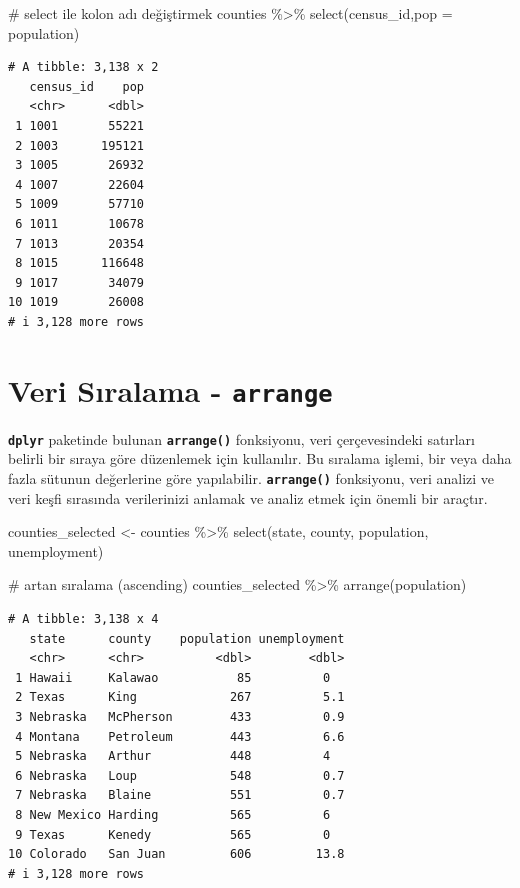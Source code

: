 \documentclass[
  letterpaper,
  DIV=11,
  numbers=noendperiod]{scrreprt}
\newenvironment{Shaded}{\begin{snugshade}}{\end{snugshade}}
\newcommand{\AttributeTok}[1]{\textcolor[rgb]{0.40,0.45,0.13}{#1}}
\newcommand{\CommentTok}[1]{\textcolor[rgb]{0.37,0.37,0.37}{#1}}
\newcommand{\FunctionTok}[1]{\textcolor[rgb]{0.28,0.35,0.67}{#1}}
\newcommand{\NormalTok}[1]{\textcolor[rgb]{0.00,0.23,0.31}{#1}}
\newcommand{\OtherTok}[1]{\textcolor[rgb]{0.00,0.23,0.31}{#1}}
\newcommand{\SpecialCharTok}[1]{\textcolor[rgb]{0.37,0.37,0.37}{#1}}
\begin{document}
\begin{Shaded}
\begin{Highlighting}[]
\CommentTok{\# select ile kolon adı değiştirmek}
\NormalTok{counties }\SpecialCharTok{\%\textgreater{}\%}
\FunctionTok{select}\NormalTok{(census\_id,}\AttributeTok{pop =}\NormalTok{ population)}
\end{Highlighting}
\end{Shaded}

\begin{verbatim}
# A tibble: 3,138 x 2
   census_id    pop
   <chr>      <dbl>
 1 1001       55221
 2 1003      195121
 3 1005       26932
 4 1007       22604
 5 1009       57710
 6 1011       10678
 7 1013       20354
 8 1015      116648
 9 1017       34079
10 1019       26008
# i 3,128 more rows
\end{verbatim}

\section*{\texorpdfstring{Veri Sıralama -
\texttt{arrange}}{Veri Sıralama - arrange}}\label{veri-sux131ralama---arrange}


\textbf{\texttt{dplyr}} paketinde bulunan \textbf{\texttt{arrange()}}
fonksiyonu, veri çerçevesindeki satırları belirli bir sıraya göre
düzenlemek için kullanılır. Bu sıralama işlemi, bir veya daha fazla
sütunun değerlerine göre yapılabilir. \textbf{\texttt{arrange()}}
fonksiyonu, veri analizi ve veri keşfi sırasında verilerinizi anlamak ve
analiz etmek için önemli bir araçtır.

\begin{Shaded}
\begin{Highlighting}[]
\NormalTok{counties\_selected }\OtherTok{\textless{}{-}}\NormalTok{ counties }\SpecialCharTok{\%\textgreater{}\%}
\FunctionTok{select}\NormalTok{(state, county, population, unemployment)}

\CommentTok{\# artan sıralama (ascending)}
\NormalTok{counties\_selected }\SpecialCharTok{\%\textgreater{}\%}
\FunctionTok{arrange}\NormalTok{(population)}
\end{Highlighting}
\end{Shaded}

\begin{verbatim}
# A tibble: 3,138 x 4
   state      county    population unemployment
   <chr>      <chr>          <dbl>        <dbl>
 1 Hawaii     Kalawao           85          0  
 2 Texas      King             267          5.1
 3 Nebraska   McPherson        433          0.9
 4 Montana    Petroleum        443          6.6
 5 Nebraska   Arthur           448          4  
 6 Nebraska   Loup             548          0.7
 7 Nebraska   Blaine           551          0.7
 8 New Mexico Harding          565          6  
 9 Texas      Kenedy           565          0  
10 Colorado   San Juan         606         13.8
# i 3,128 more rows
\end{verbatim}
\end{document}
